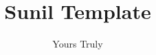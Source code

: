 \documentclass[sunil1,ChapterTOCs]{sunil} %
\begin{document}
\frontmatter

\title{Sunil Template} %
\author{Yours Truly}
\maketitle

%
\tableofcontents
%
%
%
%

\mainmatter


%




\printindex
\end{document}
